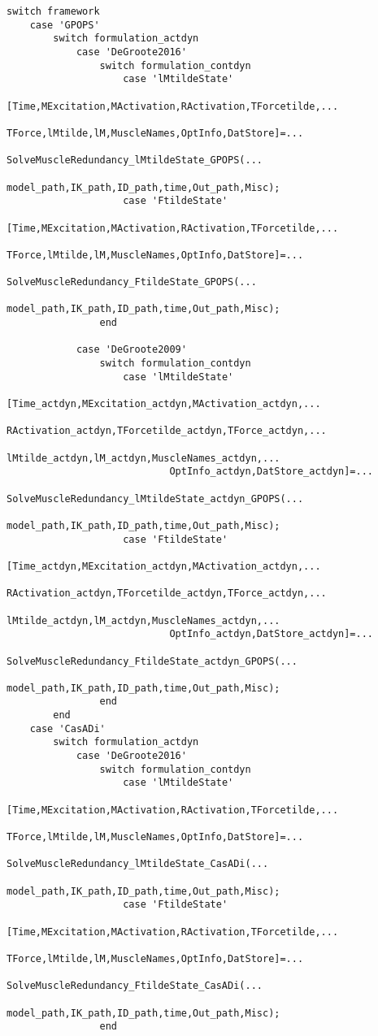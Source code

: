 \documentclass[a4paper,oneside,11pt]{article}
\begin{document}
\begin{lstlisting}[frame=none,basicstyle=\tiny]
%% Solve the problem
switch framework
    case 'GPOPS'
        switch formulation_actdyn
            case 'DeGroote2016'     
                switch formulation_contdyn
                    case 'lMtildeState'
                        [Time,MExcitation,MActivation,RActivation,TForcetilde,...
                            TForce,lMtilde,lM,MuscleNames,OptInfo,DatStore]=...
                            SolveMuscleRedundancy_lMtildeState_GPOPS(...
                            model_path,IK_path,ID_path,time,Out_path,Misc);
                    case 'FtildeState'   
                        [Time,MExcitation,MActivation,RActivation,TForcetilde,...
                            TForce,lMtilde,lM,MuscleNames,OptInfo,DatStore]=...
                            SolveMuscleRedundancy_FtildeState_GPOPS(...
                            model_path,IK_path,ID_path,time,Out_path,Misc);
                end

            case 'DeGroote2009' 
                switch formulation_contdyn
                    case 'lMtildeState'
                        [Time_actdyn,MExcitation_actdyn,MActivation_actdyn,...
                            RActivation_actdyn,TForcetilde_actdyn,TForce_actdyn,...
                            lMtilde_actdyn,lM_actdyn,MuscleNames_actdyn,...
                            OptInfo_actdyn,DatStore_actdyn]=...
                            SolveMuscleRedundancy_lMtildeState_actdyn_GPOPS(...
                            model_path,IK_path,ID_path,time,Out_path,Misc);
                    case 'FtildeState'   
                        [Time_actdyn,MExcitation_actdyn,MActivation_actdyn,...
                            RActivation_actdyn,TForcetilde_actdyn,TForce_actdyn,...
                            lMtilde_actdyn,lM_actdyn,MuscleNames_actdyn,...
                            OptInfo_actdyn,DatStore_actdyn]=...
                            SolveMuscleRedundancy_FtildeState_actdyn_GPOPS(...
                            model_path,IK_path,ID_path,time,Out_path,Misc);
                end
        end
    case 'CasADi'
        switch formulation_actdyn
            case 'DeGroote2016'      
                switch formulation_contdyn
                    case 'lMtildeState'
                        [Time,MExcitation,MActivation,RActivation,TForcetilde,...
                            TForce,lMtilde,lM,MuscleNames,OptInfo,DatStore]=...
                            SolveMuscleRedundancy_lMtildeState_CasADi(...
                            model_path,IK_path,ID_path,time,Out_path,Misc);
                    case 'FtildeState'   
                        [Time,MExcitation,MActivation,RActivation,TForcetilde,...
                            TForce,lMtilde,lM,MuscleNames,OptInfo,DatStore]=...
                            SolveMuscleRedundancy_FtildeState_CasADi(...
                            model_path,IK_path,ID_path,time,Out_path,Misc);
                end


\end{lstlisting}
\end{document}
